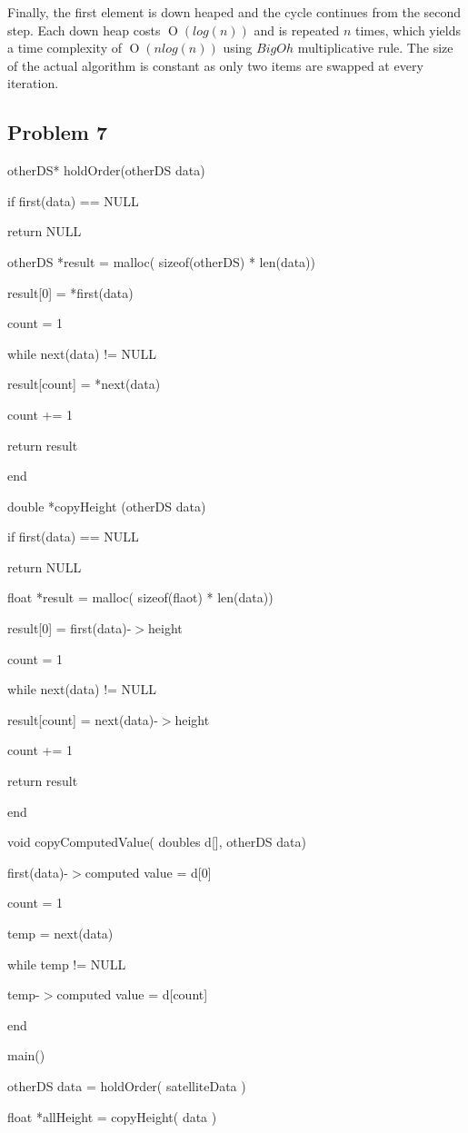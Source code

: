 \documentclass[10pt,letterpaper,oneside]{article}
\newcommand{\Problem}[1]{\subsection*{Problem #1}}
\DeclareMathOperator{\Omicron}{O}
\newcommand{\BigOh}[1]{\Omicron(#1)}
\newcommand\tab[1][1cm]{\hspace*{#1}}
\begin{document}
Finally, the first element is down heaped and the cycle continues from the second step. Each down heap costs $\BigOh{log(n)}$ and is repeated $n$ times, which yields a time complexity of $\BigOh{nlog(n)}$ using $Big Oh$ multiplicative rule. The size of the actual algorithm is constant as only two items are swapped at every iteration.


\Problem{7}

otherDS* holdOrder(otherDS data)

\tab if first(data) == NULL

\tab\tab return NULL

\tab otherDS *result = malloc( sizeof(otherDS) * len(data))

\tab result[0] = *first(data)

\tab count = 1

\tab while next(data) != NULL

\tab\tab result[count] = *next(data)

\tab\tab count += 1

\tab return result

end

double *copyHeight (otherDS data)

\tab if first(data) == NULL

\tab\tab return NULL

\tab float *result = malloc( sizeof(flaot) * len(data))

\tab result[0] = first(data)-$>$height

\tab count = 1

\tab while next(data) != NULL

\tab\tab result[count] = next(data)-$>$height

\tab\tab count += 1

\tab return result

end

void copyComputedValue( doubles d[], otherDS data)

\tab first(data)-$>$computed value = d[0]

\tab count = 1

\tab temp = next(data)

\tab while temp != NULL

\tab\tab temp-$>$computed value = d[count]

end

main()

\tab otherDS data = holdOrder( satelliteData )

\tab float *allHeight = copyHeight( data )
\end{document}

